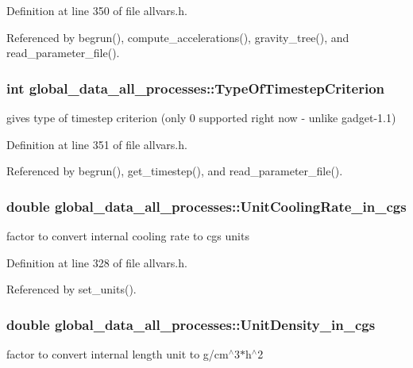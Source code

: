 Definition at line 350 of file allvars.h.



Referenced by begrun(), compute\_\-accelerations(), gravity\_\-tree(), and read\_\-parameter\_\-file().

\hypertarget{structglobal__data__all__processes_a2cc704c49ada031fae9619dbf163e32d}{
\subsubsection[{TypeOfTimestepCriterion}]{\setlength{\rightskip}{0pt plus 5cm}int {\bf global\_\-data\_\-all\_\-processes::TypeOfTimestepCriterion}}}
\label{structglobal__data__all__processes_a2cc704c49ada031fae9619dbf163e32d}
gives type of timestep criterion (only 0 supported right now -\/ unlike gadget-\/1.1) 

Definition at line 351 of file allvars.h.



Referenced by begrun(), get\_\-timestep(), and read\_\-parameter\_\-file().

\hypertarget{structglobal__data__all__processes_a79739025eb7e66065966227036437e06}{
\subsubsection[{UnitCoolingRate\_\-in\_\-cgs}]{\setlength{\rightskip}{0pt plus 5cm}double {\bf global\_\-data\_\-all\_\-processes::UnitCoolingRate\_\-in\_\-cgs}}}
\label{structglobal__data__all__processes_a79739025eb7e66065966227036437e06}
factor to convert internal cooling rate to cgs units 

Definition at line 328 of file allvars.h.



Referenced by set\_\-units().

\hypertarget{structglobal__data__all__processes_aeccb92d371d0cfbd90cc34f85c8aa25f}{
\subsubsection[{UnitDensity\_\-in\_\-cgs}]{\setlength{\rightskip}{0pt plus 5cm}double {\bf global\_\-data\_\-all\_\-processes::UnitDensity\_\-in\_\-cgs}}}
\label{structglobal__data__all__processes_aeccb92d371d0cfbd90cc34f85c8aa25f}
factor to convert internal length unit to g/cm$^\wedge$3$\ast$h$^\wedge$2 

